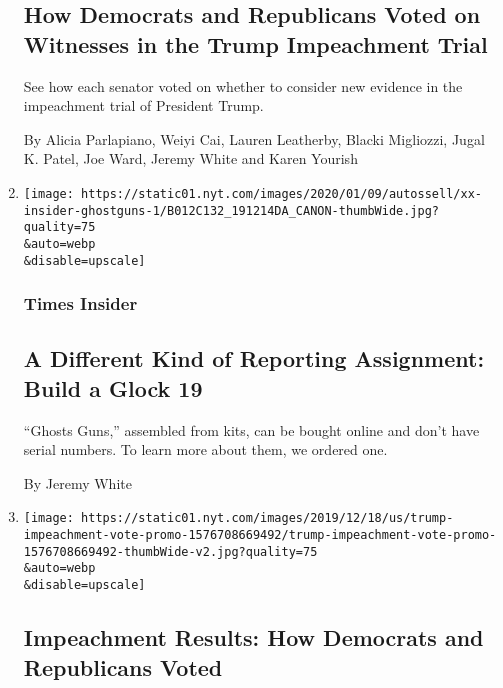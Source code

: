 \begin{enumerate}
  \hypertarget{how-democrats-and-republicans-voted-on-witnesses-in-the-trump-impeachment-trial}{%
  \subsection{How Democrats and Republicans Voted on Witnesses in the
  Trump Impeachment
  Trial}\label{how-democrats-and-republicans-voted-on-witnesses-in-the-trump-impeachment-trial}}

  See how each senator voted on whether to consider new evidence in the
  impeachment trial of President Trump.

  By Alicia Parlapiano, Weiyi Cai, Lauren Leatherby, Blacki Migliozzi,
  Jugal K. Patel, Joe Ward, Jeremy White and Karen Yourish
\item
  \href{/2020/01/09/reader-center/glock-19-kit.html}{}

  \texttt{[image: https://static01.nyt.com/images/2020/01/09/autossell/xx-insider-ghostguns-1/B012C132\_191214DA\_CANON-thumbWide.jpg?quality=75\\\&auto=webp\\\&disable=upscale]}

  \hypertarget{times-insider}{%
  \subsubsection{Times Insider}\label{times-insider}}

  \hypertarget{a-different-kind-of-reporting-assignment-build-a-glock-19}{%
  \subsection{A Different Kind of Reporting Assignment: Build a Glock
  19}\label{a-different-kind-of-reporting-assignment-build-a-glock-19}}

  ``Ghosts Guns,'' assembled from kits, can be bought online and don't
  have serial numbers. To learn more about them, we ordered one.

  By Jeremy White
\item
  \href{/interactive/2019/12/18/us/politics/trump-impeachment-vote.html}{}

  \texttt{[image: https://static01.nyt.com/images/2019/12/18/us/trump-impeachment-vote-promo-1576708669492/trump-impeachment-vote-promo-1576708669492-thumbWide-v2.jpg?quality=75\\\&auto=webp\\\&disable=upscale]}

  \hypertarget{impeachment-results-how-democrats-and-republicans-voted}{%
  \subsection{Impeachment Results: How Democrats and Republicans
  Voted}\label{impeachment-results-how-democrats-and-republicans-voted}}


\end{enumerate}
